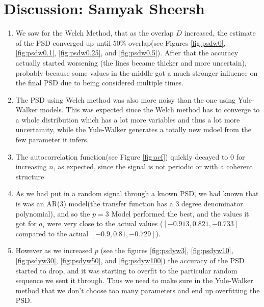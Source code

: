 \documentclass{article}
\begin{document}
\section{Discussion: Samyak Sheersh}
\begin{enumerate}
  \item We saw for the Welch Method, that as the overlap $D$ increased, the estimate of the PSD converged up until 50\% overlap(see Figures \ref{fig:psdw0}, \ref{fig:psdw0.1}, \ref{fig:psdw0.25}, and \ref{fig:psdw0.5}). After that the accuracy actually started worsening (the lines became thicker and more uncertain), probably because some values in the middle got a much stronger influence on the final PSD due to being considered multiple times.
  \item The PSD using Welch method was also more noisy than the one using Yule-Walker models. This was expected since the Welch method has to converge to a whole distribution which has a lot more variables and thus a lot more uncertainity, while the Yule-Walker generates a totally new mdoel from the few parameter it infers.
  \item The autocorrelation function(see Figure \ref{fig:acf}) quickly decayed to $0$ for increasing $n$, as expected, since the signal is not periodic or with a coherent structure 
  \item As we had put in a random signal through a known PSD, we had known that is was an AR(3) model(the transfer function has a 3 degree denominator polynomial), and so the $p=3$ Model performed the best, and the values it got for $a_i$ were very close to the actual values ($[-0.913,0.821,-0.733]$ compared to the actual $[-0.9, 0.81,-0.729]$).
  \item However as we increased $p$ (see the figures \ref{fig:psdyw3}, \ref{fig:psdyw10}, \ref{fig:psdyw30}, \ref{fig:psdyw50}, and \ref{fig:psdyw100}) the accuracy of the PSD started to drop, and it was starting to overfit to the particular random sequence we sent it through. Thus we need to make sure in the Yule-Walker method that we don't choose too many parameters and end up overfitting the PSD. 
\end{enumerate}
\end{document}
